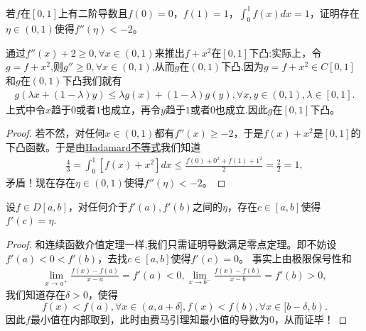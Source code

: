 \documentclass[../../main.tex]{subfiles}
\begin{document}
\begin{example}
若$f$在$[0,1]$上有二阶导数且$f(0) = 0$，$f(1) = 1$，$\int_0^1 f(x)dx = 1$，证明存在$\eta\in(0,1)$使得$f''(\eta)< -2$。
\end{example}
\begin{remark}
通过$f''(x)+2\geq 0,\forall x\in(0,1)$来推出$f + x^2$在$[0,1]$下凸:实际上，令$g=f+x^2$,则$g''\geq 0,\forall x\in(0,1)$,从而$g$在$(0,1)$下凸.因为$g = f + x^2\in C[0,1]$和$g$在$(0,1)$下凸我们就有
\begin{align*}
g(\lambda x + (1 - \lambda)y)\leq\lambda g(x) + (1 - \lambda)g(y),\forall x,y\in(0,1),\lambda\in[0,1].
\end{align*}
上式中令$x$趋于$0$或者$1$也成立，再令$y$趋于$1$或者$0$也成立.因此$g$在$[0,1]$下凸。 
\end{remark}
\begin{proof}
若不然，对任何$x\in(0,1)$都有$f''(x)\geq -2$，于是$f(x) + x^2$是$[0,1]$的下凸函数。于是由\hyperref[theorem:Hadamard不等式]{Hadamard不等式}我们知道
\begin{align*}
\frac{4}{3}=\int_0^1 [f(x) + x^2]dx\leq\frac{f(0) + 0^2 + f(1) + 1^2}{2}=\frac{2}{2}=1,
\end{align*}
矛盾！现在存在$\eta\in(0,1)$使得$f''(\eta)< -2$。
\end{proof}

\begin{theorem}\label{theorem:导数介值定理}
设\(f \in D[a,b]\)，对任何介于\(f'(a),f'(b)\)之间的\(\eta\)，存在\(c \in [a,b]\)使得\(f'(c)=\eta\).
\end{theorem}
\begin{proof}
和连续函数介值定理一样,我们只需证明导数满足零点定理。即不妨设\(f'(a) < 0 < f'(b)\)，去找\(c \in [a,b]\)使得\(f'(c)=0\)。
事实上由极限保号性和
\begin{align*}
\lim_{x \to a^{+}}\frac{f(x)-f(a)}{x - a}=f'(a)<0,\lim_{x \to b^{-}}\frac{f(x)-f(b)}{x - b}=f'(b)>0,
\end{align*}
我们知道存在\(\delta>0\)，使得
\[f(x)<f(a),\forall x \in (a,a + \delta],f(x)<f(b),\forall x \in [b - \delta,b).\]
因此\(f\)最小值在内部取到，此时由费马引理知最小值的导数为\(0\)，从而证毕！
\end{proof}
\end{document}
